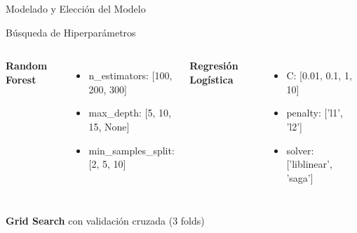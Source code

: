 \begin{frame}{Modelado y Elección del Modelo}
    \vsp
    \begin{exampleblock}{Búsqueda de Hiperparámetros}
        \begin{columns}
            \textbf{Random Forest}
            \begin{itemize}
                \item n\_estimators: [100, 200, 300]
                \item max\_depth: [5, 10, 15, None]
                \item min\_samples\_split: [2, 5, 10]
            \end{itemize}
            \textbf{Regresión Logística}
            \begin{itemize}
                \item C: [0.01, 0.1, 1, 10]
                \item penalty: ['l1', 'l2']
                \item solver: ['liblinear', 'saga']
            \end{itemize}
        \end{columns}
        \vsp
        \textbf{Grid Search} con validación cruzada (3 folds)
    \end{exampleblock}
\end{frame}

